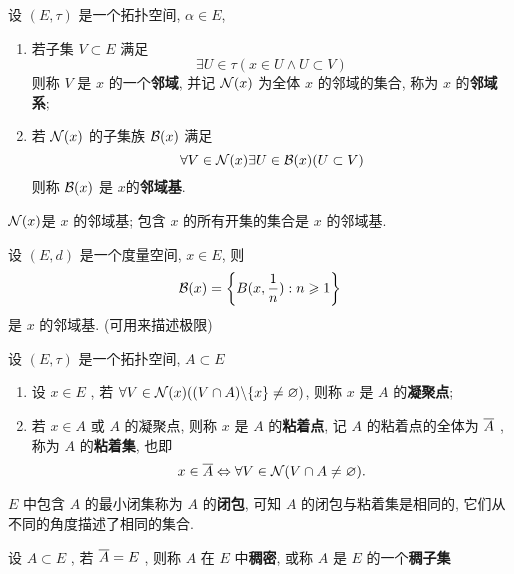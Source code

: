  \begin{Def}[邻域基]\label{def:邻域基}
       设 $ (E, \tau) $ 是一个拓扑空间, $ \alpha\in E $, 
       \begin{enumerate}[(1)]
            \item 若子集 $ V\subset E $ 满足
            \[
                 \exists U\in \tau(x\in U\wedge U\subset V)
            \]
            则称 $ V $ 是 $ x $ 的一个\textbf{邻域}, 并记 $ \CN(x) $ 为全体 $ x $ 的邻域的集合, 称为 $ x $ 的\textbf{邻域系};
            \item 若 $ \CN(x) $ 的子集族 $ \CB(x) $ 满足
            \[
                 \forall V\in \CN(x)\exists U\in \CB(x)(U\subset V)
            \]  
            则称 $ \CB(x) $ 是 $ x $的\textbf{邻域基}. 
       \end{enumerate}
 \end{Def}
 \begin{Rmk}
      $ \CN(x) $是 $ x $  的邻域基; 包含 $ x $ 的所有开集的集合是 $ x $ 的邻域基. 
 \end{Rmk}
 \begin{Ex}
      设 $ (E, d) $ 是一个度量空间, $ x\in E $, 则 
      \[
          \CB(x)=\left\{ B(x,\frac{1}{n}): n\geqslant 1 \right\} 
      \]
      是 $ x $ 的邻域基. (可用来描述极限)
 \end{Ex}
 \begin{Def}[粘着集]
     设 $ (E, \tau) $ 是一个拓扑空间, $ A\subset E $ 
     \begin{enumerate}[(1)]
          \item 设 $ x\in E $ , 若 $ \forall V\in \CN(x)((V\cap A)\bs \{ x \}\neq\varnothing) $, 则称 $ x $ 是 $ A $ 的\textbf{凝聚点};
          \item 若 $ x\in A $ 或 $ A $  的凝聚点, 则称 $ x $ 是 $ A $ 的\textbf{粘着点}, 记 $ A $ 的粘着点的全体为 $ \baro{A} $ , 称为 $ A $ 的\textbf{粘着集}, 也即
          \[
               x\in \baro{A}\Leftrightarrow \forall V\in \CN(V\cap A\neq\varnothing).    
          \]
     \end{enumerate}
 \end{Def}
 \begin{Rmk}
      $ E $ 中包含 $ A $ 的最小闭集称为 $ A $ 的\textbf{闭包}, 可知 $ A $ 的闭包与粘着集是相同的, 它们从不同的角度描述了相同的集合. 
 \end{Rmk}
 \begin{Def}[稠密]\label{def:稠密}
       设 $ A\subset E $ , 若 $ \baro{A}=E $ , 则称 $ A $ 在 $ E $ 中\textbf{稠密}, 或称 $ A $ 是 $ E $ 的一个\textbf{稠子集}
 \end{Def}
